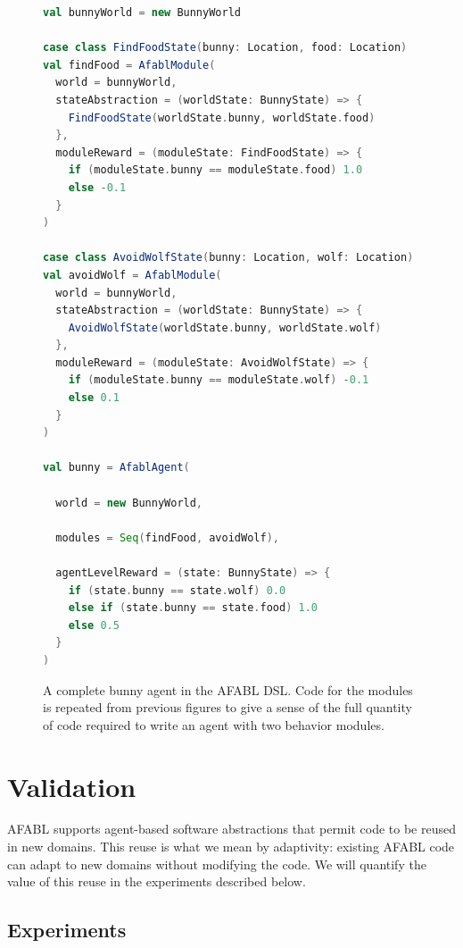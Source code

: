 \begin{figure}[h]
\begin{center}

\begin{lstlisting}[language=Scala]
val bunnyWorld = new BunnyWorld

case class FindFoodState(bunny: Location, food: Location)
val findFood = AfablModule(
  world = bunnyWorld,
  stateAbstraction = (worldState: BunnyState) => {
    FindFoodState(worldState.bunny, worldState.food)
  },
  moduleReward = (moduleState: FindFoodState) => {
    if (moduleState.bunny == moduleState.food) 1.0
    else -0.1
  }
)

case class AvoidWolfState(bunny: Location, wolf: Location)
val avoidWolf = AfablModule(
  world = bunnyWorld,
  stateAbstraction = (worldState: BunnyState) => {
    AvoidWolfState(worldState.bunny, worldState.wolf)
  },
  moduleReward = (moduleState: AvoidWolfState) => {
    if (moduleState.bunny == moduleState.wolf) -0.1
    else 0.1
  }
)

val bunny = AfablAgent(

  world = new BunnyWorld,

  modules = Seq(findFood, avoidWolf),

  agentLevelReward = (state: BunnyState) => {
    if (state.bunny == state.wolf) 0.0
    else if (state.bunny == state.food) 1.0
    else 0.5
  }
)
\end{lstlisting}

\caption{A complete bunny agent in the AFABL DSL. Code for the modules is repeated from previous figures to give a sense of the full quantity of code required to write an agent with two behavior modules.}
\end{center}
\label{fig:afabl-bunny-code}
\end{figure}


\section{Validation}

AFABL supports agent-based software abstractions that permit code to be reused in new domains.  This reuse is what we mean by adaptivity: existing AFABL code can adapt to new domains without modifying the code.  We will quantify the value of this reuse in the experiments described below.

\subsection{Experiments}

